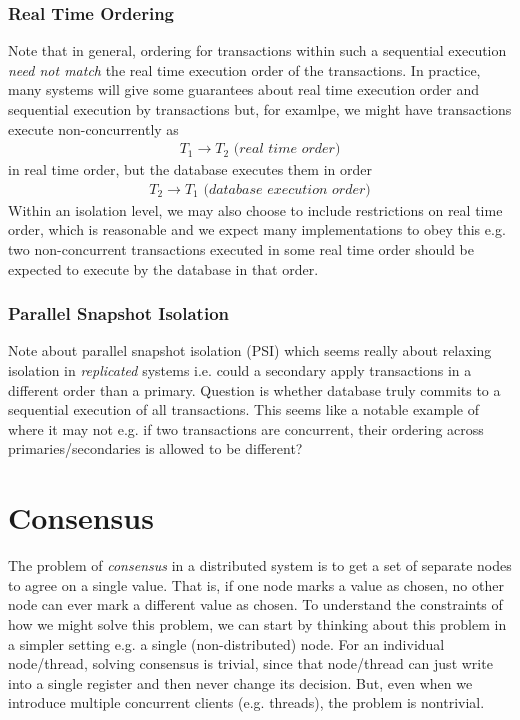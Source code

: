 \documentclass[10pt,a4paper]{article}
\begin{document}
\subsubsection{Real Time Ordering}

Note that in general, ordering for transactions within such a sequential execution \textit{need not match} the real time execution order of the transactions. In practice, many systems will give some guarantees about real time execution order and sequential execution by transactions but, for examlpe, we might have transactions execute non-concurrently as
\begin{align*}
    T_1 \rightarrow T_2 \textit{ (real time order)}
\end{align*} 
in real time order, but the database executes them in order 
\begin{align*}
    T_2 \rightarrow T_1 \textit{ (database execution order)}
\end{align*}
Within an isolation level, we may also choose to include restrictions on real time order, which is reasonable and we expect many implementations to obey this e.g. two non-concurrent transactions executed in some real time order should be expected to execute by the database in that order.

\subsubsection{Parallel Snapshot Isolation}
Note about parallel snapshot isolation (PSI) which seems really about relaxing isolation in \textit{replicated} systems i.e. could a secondary apply transactions in a different order than a primary. Question is whether database truly commits to a sequential execution of all transactions. This seems like a notable example of where it may not e.g. if two transactions are concurrent, their ordering across primaries/secondaries is allowed to be different?


\section{Consensus}

The problem of \textit{consensus} in a distributed system is to get a set of separate nodes to agree on a single value. That is, if one node marks a value as chosen, no other node can ever mark a different value as chosen. To understand the constraints of how we might solve this problem, we can start by thinking about this problem in a simpler setting e.g. a single (non-distributed) node. For an individual node/thread, solving consensus is trivial, since that node/thread can just write into a single register and then never change its decision. But, even when we introduce multiple concurrent clients (e.g. threads), the problem is nontrivial. 
\end{document}
